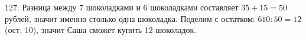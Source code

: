 127. Разница между 7 шоколадками и 6 шоколадками составляет $35+15=50$ рублей, значит именно столько одна шоколадка. Поделим с остатком: $610:50=12$ (ост. 10), значит Саша сможет купить 12 шоколадок.\\
